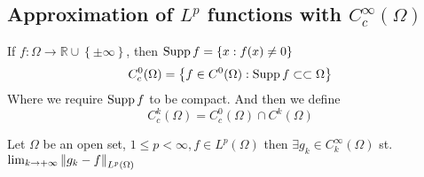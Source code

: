 \documentclass[../main.tex]{subfiles}
\begin{document}
\subsection{Approximation of $L^p$ functions with $C_c^\infty( \Omega) $ }
\begin{defn}
	If $f:\Omega\to \mathbb{R}\cup \left\{ \pm \infty  \right\} $, then $\operatorname{Supp} f = \left\{ x: f( x) \neq 0 \right\} $ \\
	\[ 
	C^{0}_c ( \Omega) = \left\{ f\in C^{0}( \Omega) :\operatorname{Supp} f \subset \subset \Omega \right\} 
	\]
Where we require $\operatorname{Supp} f$ to be compact.	
And then we define
\[ 
	C^{k}_c( \Omega)  = C^{0}_c ( \Omega) \cap C^{k}( \Omega) 
\]
\end{defn}
\begin{thm}
	Let $\Omega$ be an open set, $1 \leq p < \infty , f\in L^p( \Omega) $ then $\exists g_k \in C_k^{ \infty }( \Omega)  $  st. $\lim_{k \to  + \infty} \left\lVert g_k -f \right\rVert_{L^{p}( \Omega) } $ 
\end{thm}
\end{document}
